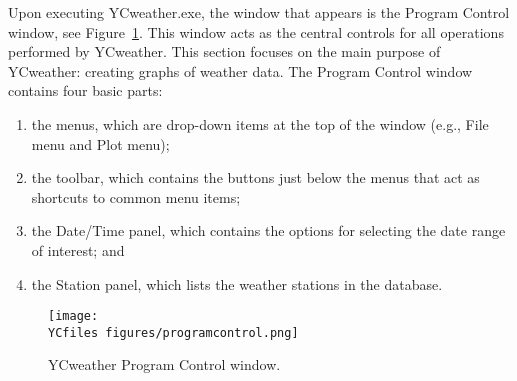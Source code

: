 \label{sec:programcontrol}
Upon executing YCweather.exe, the window that appears is the Program Control window, see Figure~\ref{fig:programcontrol}.  This window acts as the central controls for all operations performed by YCweather. This section focuses on the main purpose of YCweather: creating graphs of weather data.  The Program Control window contains four basic parts: 
\begin{enumerate}
	\item the menus, which are drop-down items at the top of the window (e.g., File menu and Plot menu); 
	\item the toolbar, which contains the buttons just below the menus that act as shortcuts to common menu items;
	\item the Date/Time panel, which contains the options for selecting the date range of interest; and
	\item the Station panel, which lists the weather stations in the database.
\end{enumerate}

\begin{figure}[ht!]\centering
	\texttt{[image: \\YCfiles figures/programcontrol.png]}
	\caption{YCweather Program Control window.}\label{fig:programcontrol}
\end{figure}


